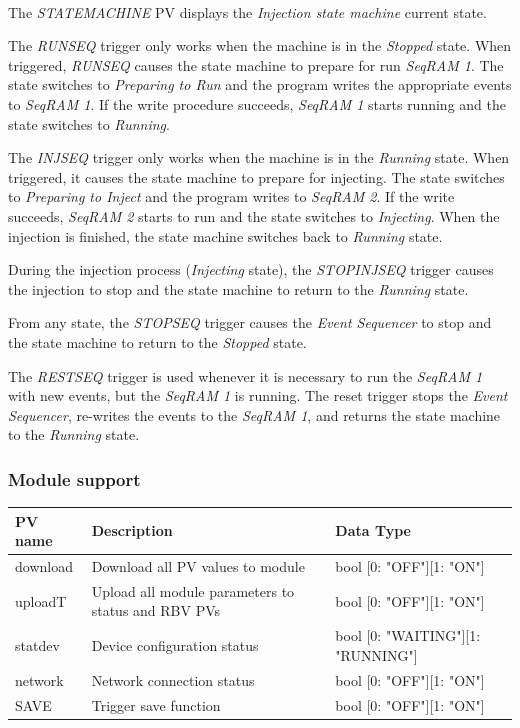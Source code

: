 \documentclass[openany]{article}
\begin{document}
			\paragraph{} The \emph{STATEMACHINE} PV displays the \emph{Injection state machine} current state.
			\par The \emph{RUNSEQ} trigger only works when the machine is in the \emph{Stopped} state. When triggered, \emph{RUNSEQ} causes the state machine to prepare for run \emph{SeqRAM 1}. The state switches to \emph{Preparing to Run} and the program writes the appropriate events to \emph{SeqRAM 1}. If the write procedure succeeds, \emph{SeqRAM 1} starts running and the state switches to \emph{Running}.
			\par The \emph{INJSEQ} trigger only works when the machine is in the \emph{Running} state. When triggered, it causes the state machine to prepare for injecting. The state switches to \emph{Preparing to Inject} and the program writes to \emph{SeqRAM 2}. If the write succeeds, \emph{SeqRAM 2} starts to run and the state switches to \emph{Injecting}. When the injection is finished, the state machine switches back to \emph{Running} state.
			\par During the injection process (\emph{Injecting} state), the \emph{STOPINJSEQ} trigger causes the injection to stop and the state machine to return to the \emph{Running} state.
			\par From any state, the \emph{STOPSEQ} trigger causes the \emph{Event Sequencer} to stop and the state machine to return to the \emph{Stopped} state.
			\par The \emph{RESTSEQ} trigger is used whenever it is necessary to run the \emph{SeqRAM 1} with new events, but the \emph{SeqRAM 1} is running. The reset trigger stops the \emph{Event Sequencer}, re-writes the events to the \emph{SeqRAM 1}, and returns the state machine to the \emph{Running} state.

		\subsubsection{Module support}\label{pvgroup:evg-module-support}
			\begin{center}
			\begin{tabular}{| m{2.8cm} m{6cm} m{6cm} |}
			    \hline
			    \bfseries PV name & \bfseries Description & \bfseries Data Type \\ \hline
			    download & Download all PV values to module & bool [0: "OFF"][1: "ON"] \\ \hline
			    uploadT & Upload all module parameters to status and RBV PVs & bool [0: "OFF"][1: "ON"] \\ \hline
			    statdev & Device configuration status & bool [0: "WAITING"][1: "RUNNING"] \\ \hline
			    network & Network connection status & bool [0: "OFF"][1: "ON"] \\ \hline
			    SAVE & Trigger save function & bool [0: "OFF"][1: "ON"] \\ \hline
			\end{tabular}
			\end{center}
\end{document}
